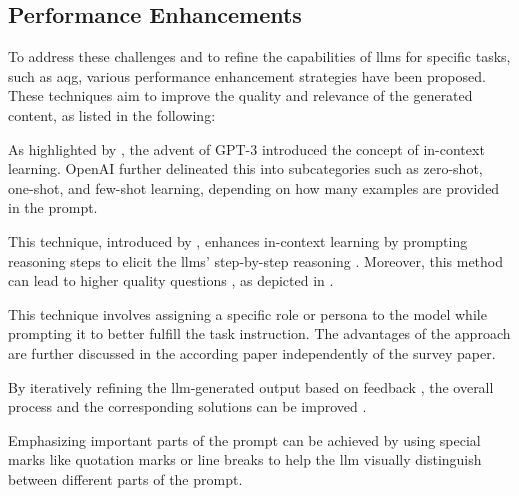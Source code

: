 \pagebreak

\subsection{Performance Enhancements}
\label{sec:performance-enhancements}

To address these challenges and to refine the capabilities of \ac{llms} for specific tasks, such as \ac{aqg}, various performance enhancement strategies have been proposed. These techniques aim to improve the quality and relevance of the generated content, as listed in the following:

 As highlighted by \cite{zhao_survey_2025}, the advent of GPT-3 \cite{brown_language_2020} introduced the concept of in-context learning. OpenAI further delineated this into subcategories such as zero-shot, one-shot, and few-shot learning, depending on how many examples are provided in the prompt.

 This technique, introduced by \cite{wei_chain--thought_2022}, enhances in-context learning by prompting reasoning steps to elicit the \ac{llms}' step-by-step reasoning \cite{zhao_survey_2025}. Moreover, this method can lead to higher quality questions \cite{scaria_automated_2024}, as depicted in \cite{wei_chain--thought_2022}.


 This technique involves assigning a specific role or persona to the model while prompting it \cite{zhao_survey_2025} to better fulfill the task instruction. The advantages of the approach are further discussed in the according paper \cite{kong_better_2024} independently of the survey paper.

 By iteratively refining the \ac{llm}-generated output based on feedback \cite{madaan_self-refine_2023}, the overall process and the corresponding solutions can be improved \cite{zhao_survey_2025}.


 Emphasizing important parts of the prompt can be achieved by using special marks like quotation marks or line breaks \cite{zhao_survey_2025} to help the \ac{llm} visually distinguish between different parts of the prompt. 

